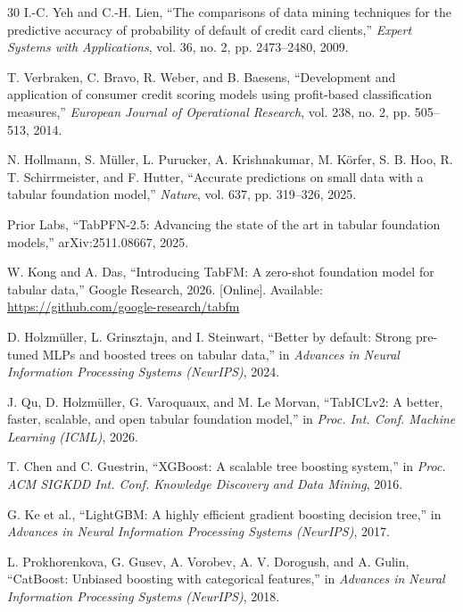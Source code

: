\documentclass[conference]{IEEEtran}
\begin{document}
\begin{thebibliography}{30}
 I.-C. Yeh and C.-H. Lien, ``The comparisons of data
mining techniques for the predictive accuracy of probability of default of
credit card clients,'' \emph{Expert Systems with Applications}, vol. 36,
no. 2, pp. 2473--2480, 2009.

 T. Verbraken, C. Bravo, R. Weber, and B. Baesens,
``Development and application of consumer credit scoring models using
profit-based classification measures,'' \emph{European Journal of
Operational Research}, vol. 238, no. 2, pp. 505--513, 2014.

 N. Hollmann, S. M\"uller, L. Purucker, A.
Krishnakumar, M. K\"orfer, S. B. Hoo, R. T. Schirrmeister, and F. Hutter,
``Accurate predictions on small data with a tabular foundation model,''
\emph{Nature}, vol. 637, pp. 319--326, 2025.

 Prior Labs, ``TabPFN-2.5: Advancing the state of the art
in tabular foundation models,'' arXiv:2511.08667, 2025.

 W. Kong and A. Das, ``Introducing TabFM: A zero-shot
foundation model for tabular data,'' Google Research, 2026. [Online].
Available: \url{https://github.com/google-research/tabfm}

 D. Holzm\"uller, L. Grinsztajn, and I. Steinwart,
``Better by default: Strong pre-tuned MLPs and boosted trees on tabular
data,'' in \emph{Advances in Neural Information Processing Systems
(NeurIPS)}, 2024.

 J. Qu, D. Holzm\"uller, G. Varoquaux, and M. Le Morvan,
``TabICLv2: A better, faster, scalable, and open tabular foundation model,''
in \emph{Proc. Int. Conf. Machine Learning (ICML)}, 2026.

 T. Chen and C. Guestrin, ``XGBoost: A scalable tree
boosting system,'' in \emph{Proc. ACM SIGKDD Int. Conf. Knowledge Discovery
and Data Mining}, 2016.

 G. Ke et al., ``LightGBM: A highly efficient gradient
boosting decision tree,'' in \emph{Advances in Neural Information Processing
Systems (NeurIPS)}, 2017.

 L. Prokhorenkova, G. Gusev, A. Vorobev, A. V.
Dorogush, and A. Gulin, ``CatBoost: Unbiased boosting with categorical
features,'' in \emph{Advances in Neural Information Processing Systems
(NeurIPS)}, 2018.

\end{thebibliography}
\end{document}
